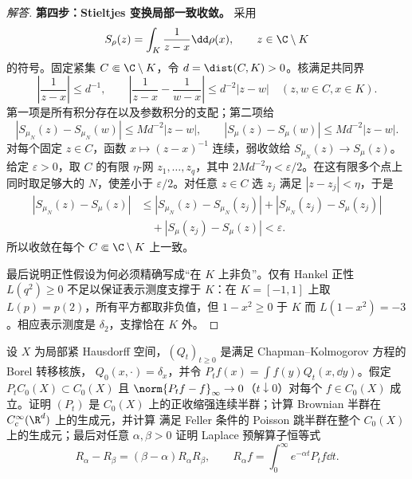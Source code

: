 \begin{proof}[解答]
\textbf{第四步：Stieltjes 变换局部一致收敛。}
采用
\[
 S_\rho(z)=\int_K\frac1{z-x}\dd\rho(x),\qquad z\in\C\setminus K
\]
的符号。固定紧集 $C\Subset\C\setminus K$，令
$d=\dist(C,K)>0$。核满足共同界
\begin{equation}\label{eq:7-4-3-stieltjes-kernel-bounds}
 \left|\frac1{z-x}\right|\le d^{-1},\qquad
 \left|\frac1{z-x}-\frac1{w-x}\right|
 \le d^{-2}|z-w|\quad(z,w\in C,x\in K).
\end{equation}
第一项是所有积分存在以及参数积分的支配；第二项给
\[
 |S_{\mu_N}(z)-S_{\mu_N}(w)|\le Md^{-2}|z-w|,
 \qquad
 |S_\mu(z)-S_\mu(w)|\le Md^{-2}|z-w|.
\]
对每个固定 $z\in C$，函数 $x\mapsto(z-x)^{-1}$ 连续，弱收敛给
$S_{\mu_N}(z)\to S_\mu(z)$。给定 $\varepsilon>0$，取 $C$ 的有限
$\eta$-网 $z_1,\ldots,z_q$，其中 $2Md^{-2}\eta<\varepsilon/2$。在这有限多个点上同时取足够大的
$N$，使差小于 $\varepsilon/2$。对任意 $z\in C$ 选 $z_j$ 满足 $|z-z_j|<\eta$，于是
\begin{align*}
 |S_{\mu_N}(z)-S_\mu(z)|
 &\le|S_{\mu_N}(z)-S_{\mu_N}(z_j)|
 +|S_{\mu_N}(z_j)-S_\mu(z_j)|\\
 &\quad+|S_\mu(z_j)-S_\mu(z)|<\varepsilon.
\end{align*}
所以收敛在每个 $C\Subset\C\setminus K$ 上一致。

最后说明正性假设为何必须精确写成“在 $K$ 上非负”。仅有 Hankel 正性
$L(q^2)\ge0$ 不足以保证表示测度支撑于 $K$：在 $K=[-1,1]$ 上取 $L(p)=p(2)$，所有平方都取非负值，但
$1-x^2\ge0$ 于 $K$ 而 $L(1-x^2)=-3$。相应表示测度是 $\delta_2$，支撑恰在 $K$ 外。
\end{proof}

\begin{problem}\label{problem:7-4-3-4}
设 $X$ 为局部紧 Hausdorff 空间，$(Q_t)_{t\ge0}$ 是满足 Chapman--Kolmogorov 方程的 Borel 转移核族，
$Q_0(x,\cdot)=\delta_x$，并令
$P_tf(x)=\int f(y)Q_t(x,\dd y)$。假定 $P_tC_0(X)\subset C_0(X)$ 且
$\norm{P_tf-f}_\infty\to0$（$t\downarrow0$）对每个 $f\in C_0(X)$ 成立。证明 $(P_t)$ 是
$C_0(X)$ 上的正收缩强连续半群；计算 Brownian 半群在 $C_c^\infty(\R^d)$ 上的生成元，并计算
满足 Feller 条件的 Poisson 跳半群在整个 $C_0(X)$ 上的生成元；最后对任意 $\alpha,\beta>0$ 证明
Laplace 预解算子恒等式
\[
 R_\alpha-R_\beta=(\beta-\alpha)R_\alpha R_\beta,
 \qquad R_\alpha f=\int_0^\infty e^{-\alpha t}P_tf\dd t.
\]
\end{problem}

